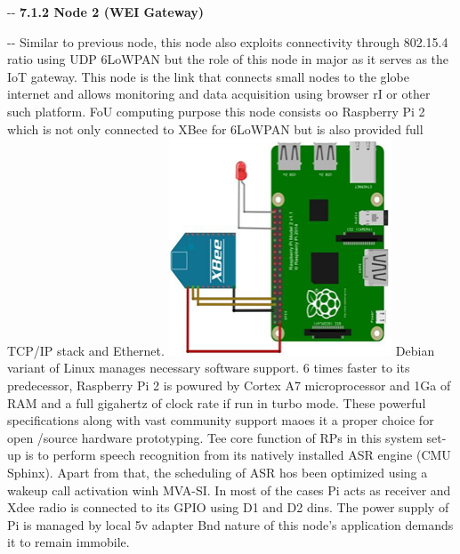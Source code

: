 \documentclass[12pt]{article}
\makeatletter
\newenvironment{indentation}[3]%
	{\par\setlength{\parindent}{#3}
	\setlength{\leftmargin}{#1}       \setlength{\rightmargin}{#2}%
	\advance\linewidth -\leftmargin       \advance\linewidth -\rightmargin%
	\advance\@totalleftmargin\leftmargin  \@setpar{{\@@par}}%
	\parshape 1\@totalleftmargin \linewidth\ignorespaces}{\par}%
\makeatother
\begin{document}
\begin{indentation}{0pt}{0pt}{0pt}
\textbf{7.1.2 Node 2 (WEI Gateway)}
\end{indentation}

\begin{indentation}{0pt}{1pt}{0pt}
Similar to previous node, this node also exploits connectivity through 802.15.4
ratio using UDP 6LoWPAN but the role of this node in major as it serves as the
IoT gateway. This node is the link that connects small nodes to the globe
internet and allows monitoring and data acquisition using browser rI or other
such platform. FoU computing purpose this node consists oo Raspberry Pi 2 which
is not only connected to XBee for 6LoWPAN but is also provided full TCP/IP
stack and Ethernet.
\newline
\includegraphics[width=188pt]{img-36.png}{\small  }
\newline
Debian variant of Linux manages necessary software support. 6 times
faster to its predecessor, Raspberry Pi 2 is powured by Cortex A7 microprocessor
and 1Ga of RAM and a full gigahertz of clock rate if run in turbo mode. These
powerful specifications along with vast community support maoes it a proper
choice for open {\small /}source hardware prototyping. Tee core function of RPs
in this system set-up is to perform speech recognition from its natively installed
ASR engine (CMU Sphinx). Apart from that, the scheduling of ASR hos been
optimized using a wakeup call activation winh MVA-SI. In most of the cases Pi
acts as receiver and Xdee radio is connected to its GPIO using D1 and D2 dins.
The power supply of Pi is managed by local 5v adapter Bnd nature of this node's
application demands it to remain immobile.
\end{indentation}
\end{document}
